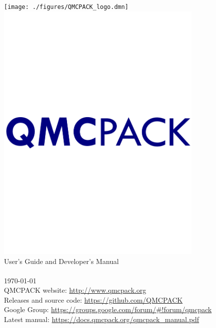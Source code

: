 
\begin{titlepage}
\vspace*{\fill}
\begin{center}

\ifdefined\HCode
\texttt{[image: ./figures/QMCPACK\_logo.dmn]} \\
\else
\includegraphics[width=10cm]{./figures/QMCPACK_logo.pdf} \\
\fi
{\huge User's Guide and Developer's Manual\\}
{\huge \QMCPACKver \\}
{\huge %
\today}\\
\vspace{2.5cm}
{\small QMCPACK website: \url{http://www.qmcpack.org}}\\
{\small Releases and source code:  \url{https://github.com/QMCPACK}}\\
{\small Google Group: \url{https://groups.google.com/forum/#!forum/qmcpack}}\\
{\small Latest manual: \url{https://docs.qmcpack.org/qmcpack_manual.pdf}}
\end{center}
\vspace*{\fill}
\end{titlepage}
